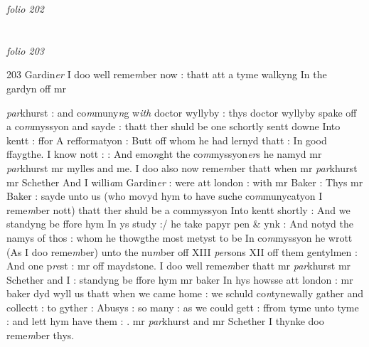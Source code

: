 \documentclass[12pt, a4paper]{book}
\begin{document}

\textit{folio 202}


         \vspace{4cm}
         
\dotfill
					  \section*{}  \subsection*{}

\textit{folio 203}



{\color{Mahogany}203} Gardin\textit{er} I doo well reme\textit{m}ber now : thatt att a tyme walkyng In the  gardyn off mr 
			
               \textit{par}khurst : and co\textit{m}muny\textit{n}g w\textit{ith} doctor wyllyby : thys 
				\marginpar[\vspace{0.5cm}{\textcolor{Gray}{D. willoughby}}]{}
			 doctor wyllyby spake off a co\textit{m}myssyon and sayde : thatt ther shuld be one schortly sentt downe Into kentt : ffor A refformatyon : Butt off whom he had lernyd thatt : In  good ffaygthe. I know nott : : And emo\textit{n}ght the  
				\marginpar[\vspace{0.5cm}{\textcolor{Gray}{m}}]{}
			 co\textit{m}myssyon\textit{er}s he namyd mr \textit{par}khurst mr mylles and me.  I doo also now reme\textit{m}ber thatt when mr \textit{par}khurst mr Schether And I willi\textit{a}m Gardin\textit{er} : were att london : with mr Baker : Thys  
				\marginpar[\vspace{0.5cm}{\textcolor{Gray}{mr Baker}}]{}
			 mr Baker : sayde unto us (who movyd hym to have suche co\textit{m}munycatyon I reme\textit{m}ber nott) thatt ther shuld be a commyssyon 
				\marginpar[\vspace{0.5cm}{\textcolor{Gray}{m}}]{}
			 Into kentt shortly : And we standyng be ffore hym In ys study :/ he take papyr pen \& ynk : And notyd the namys  
				\marginpar[\vspace{0.5cm}{\textcolor{Gray}{m}}]{}
			 of thos : whom he thowgthe most metyst to be In co\textit{m}myssyon he wrott (As I doo reme\textit{m}ber) unto the nu\textit{m}ber off XIII \textit{per}sons XII off them gentylmen : And one p\textit{re}st : mr off maydstone. 
				\marginpar[\vspace{0.5cm}{\textcolor{Gray}{Mr Baker}}]{}
			 I doo well reme\textit{m}ber thatt mr \textit{par}khurst mr Schether and I : standyng be ffore hym mr baker
			 In hys howsse att london : mr baker dyd wyll us 
				\marginpar[\vspace{0.5cm}{\textcolor{Gray}{m}}]{}
			 thatt when we came home : we schuld co\textit{n}tynewally gather and collectt : to gyther : Abusys : so many : as we could gett : ffrom tyme  unto tyme : and lett hym have them : . mr \textit{par}khurst and mr Schether I thynke doo reme\textit{m}ber thys.
\end{document}
